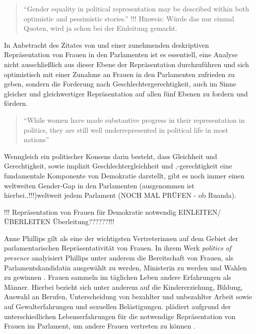 \documentclass[12pt, 
    twoside=false, 
    bibliography=totoc, 
    numbers=endperiod, 
    headings=normal, 
    toc=chapterentrydotfill
    ]{scrbook}
\begin{document}
\begin{quote}
    \enquote{Gender equality in political representation may be described within both optimistic and pessimistic stories.} \parencite[149]{celis_2018} !!! Hinweis: Würde das nur einmal Quoten, wird ja schon bei der Einleitung gemacht.
\end{quote} 

In Anbetracht des Zitates von \textcite{celis_2018} und einer zunehmenden deskriptiven Repräsentation von Frauen in den Parlamenten ist es essentiell, eine Analyse nicht ausschließlich aus dieser Ebene der Repräsentation durchzuführen und sich optimistisch mit einer Zunahme an Frauen in den Parlamenten zufrieden zu geben, sondern die Forderung nach Geschlechtergerechtigkeit, auch im Sinne gleicher und gleichwertiger Repräsentation auf allen fünf Ebenen zu fordern und fördern. 

\begin{quote}
    \enquote{While women have made substantive progress in their representation in politics, they are still well underrepresented in political life in most nations} \parencite[2]{coffe_2013}
\end{quote}

Wenngleich ein politischer Konsens darin besteht, dass Gleichheit und Gerechtigkeit, sowie implizit Geschlechtergleichheit und ,-gerechtigkeit eine fundamentale Komponente von Demokratie darstellt, gibt es noch immer einen weltweiten Gender-Gap in den Parlamenten (ausgenommen ist hierbei..!!!)weltweit jedem Parlament (NOCH MAL PRÜFEN - ob Ruanda).  

!!! Repräsentation von Frauen für Demokratie notwendig  EINLEITEN/ÜBERLEITEN
Überleitung??????!!!
 


Anne Phillips gilt als eine der wichtigsten Vertreterinnen auf dem Gebiet der parlamentarischen Repräsentativität von Frauen. In ihrem Werk \emph{politics of presence} \parencite*{phillips_1998} analyisiert Phillips unter anderem die Bereitschaft von Frauen, als Parlamentskandidatin ausgewählt zu werden, Ministerin zu werden und Wahlen zu gewinnen \parencite[vgl.][416f.]{blaxill_2016}. Frauen sammeln im täglichen Leben andere Erfahrungen als Männer. Hierbei bezieht sich \textcite{phillips_1998} unter anderem auf die Kindererziehung, Bildung, Auswahl an Berufen, Unterscheidung von bezahlter und unbezahlter Arbeit sowie auf Gewalterfahrungen und sexuellen Belästigungen. \textcite{phillips_1998} plädiert aufgrund der unterschiedlichen Lebenserfahrungen für die notwendige Repräsentation von Frauen im Parlament, um andere Frauen vertreten zu können \parencite[vgl.][52]{wangnerud_2009}.
\end{document}
